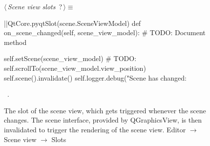 \documentclass[%
    a4paper,    %
    justified,  %
    nobib,      %
    openany     %
]{tufte-book}
\begin{document}
\begin{figure}
\begin{flushleft} \small
\begin{minipage}{\linewidth}\label{scrap97}\raggedright\small
{} $\langle\,${\itshape Scene view slots}\nobreak\ {\footnotesize {?}}$\,\rangle\equiv$
\vspace{-1ex}
\begin{pythoncode}
|\normalfont{}\fontfamily{}|QtCore.pyqtSlot(scene.SceneViewModel)
def on_scene_changed(self, scene_view_model):
    # TODO: Document method

    self.setScene(scene_view_model)
    # TODO: self.scrollTo(scene_view_model.view_position)
    self.scene().invalidate()
    self.logger.debug("Scene has changed: %
\end{pythoncode}
\vspace{1.5ex}
\footnotesize
\begin{list}{}{\setlength{\itemsep}{-\parsep}\setlength{\itemindent}{-\leftmargin}}
\item \NWtxtMacroRefIn\ .

\item{}
\end{list}
\end{minipage}\vspace{4ex}
\end{flushleft}
\caption{The slot of the scene view, which gets triggered whenever the scene
  changes. The scene interface, provided by QGraphicsView, is then invalidated
  to trigger the rendering of the scene view.
  \newline{}\newline{}Editor $\rightarrow$ Scene view $\rightarrow$
  Slots}
\label{editor:lst:scene-view:slots:on-scene-changed}
\end{figure}
\end{document}
